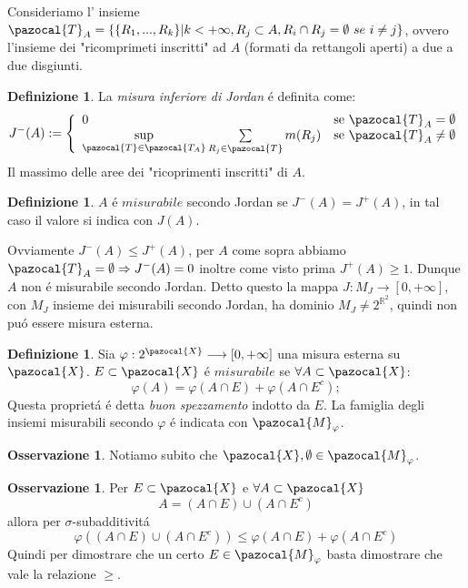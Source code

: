 \documentclass[11pt,a4paper]{report}
\theoremstyle{plain}
\theoremstyle{definition}
\newtheorem{defn}[thm]{Definizione} %
\newtheorem{oss}[thm]{Osservazione} %
\newcommand{\twopartdef}[4]
{
	\left\{
		\begin{array}{ll}
			#1 & \mbox{se } #2 \\
			#3 & \mbox{se } #4
		\end{array}
	\right.
}
\begin{document}
Consideriamo l' insieme $\pazocal{T}_A = \left\{ \{R_1,...,R_k\} | k < +\infty, R_j \subset A, R_i \cap R_j = \emptyset\ se\ i \ne j \right\}$, ovvero l'insieme dei "ricomprimeti inscritti" ad $A$ (formati da rettangoli aperti) a due a due disgiunti.

\begin{defn}
	La \textit{misura inferiore di Jordan} \'e definita come:
	\[
J^-(A) := \twopartdef { 0 } {\pazocal{T}_A = \emptyset} {\sup\limits_{\pazocal{T}\in\pazocal{T_A}} \sum\limits_{R_j \in \pazocal{T}}m(R_j)} {\pazocal{T}_A \ne \emptyset}
	\]
Il massimo delle aree dei "ricoprimenti inscritti" di $A$.
\end{defn}

\begin{defn}
	$A$ \'e $misurabile$ secondo Jordan se $J^-(A) = J^+(A)$, in tal caso il valore si indica con $J(A)$.
\end{defn}
Ovviamente $J^-(A) \le J^+(A)$,  per $A$ come sopra abbiamo $\pazocal{T}_A = \emptyset \Rightarrow J^-(A)=0$ inoltre come visto prima $J^+(A) \ge 1$. Dunque $A$ non \'e misurabile secondo Jordan. Detto questo la mappa $J : M_J \longrightarrow [0, +\infty]$, con $M_J$ insieme dei misurabili secondo Jordan, ha dominio $M_J \ne 2^{\mathbb{R}^2}$, quindi non pu\'o essere misura esterna.

\begin{defn}
Sia $\varphi : 2^{\pazocal{X}} \longrightarrow [0,+\infty]$ una misura esterna su $\pazocal{X}$. $E \subset \pazocal{X}$ \'e $misurabile$ se $\forall A \subset \pazocal{X}$:
\[
	\varphi(A) = \varphi(A \cap E) + \varphi(A \cap E^c);
\]
Questa propriet\'a \'e detta \textit{buon spezzamento} indotto da $E$. La famiglia degli insiemi misurabili secondo $\varphi$ \'e indicata con $\pazocal{M}_\varphi$.
\end{defn}

\begin{oss}
	Notiamo subito che $\pazocal{X}, \emptyset \in \pazocal{M}_\varphi$.
\end{oss}
\begin{oss}
Per $E \subset \pazocal{X}$ e $\forall A \subset \pazocal{X}$
	\[
		A = (A \cap E) \cup (A \cap E^c)
	\]
	allora per $\sigma$-subadditivit\'a
	\[
		\varphi((A \cap E) \cup (A \cap E^c)) \le \varphi(A \cap E) + \varphi(A \cap E^c)
	\]
Quindi per dimostrare che un certo $E \in \pazocal{M}_\varphi$ basta dimostrare che vale la relazione $\ge$.
\end{oss}
\end{document}
